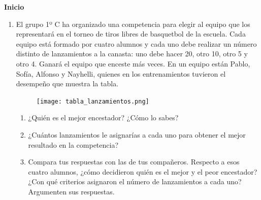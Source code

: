 \documentclass[11pt]{book}
\begin{document}
\begin{boxK}
  \begin{center}\textbf{Inicio}\end{center}
  \begin{enumerate}
    \item El grupo 1º C ha organizado una competencia para elegir al equipo que los
          representará en el torneo de tiros libres de basquetbol de la escuela. Cada
          equipo está formado por cuatro alumnos y cada uno debe realizar un número distinto
          de lanzamientos a la canasta: uno debe hacer 20, otro 10, otro 5 y
          otro 4. Ganará el equipo que enceste más veces.
          En un equipo están Pablo, Sofía, Alfonso y Nayhelli, quienes en los entrenamientos
          tuvieron el desempeño que muestra la tabla.
          \begin{figure}[H]
            \centering
            \texttt{[image: tabla\_lanzamientos.png]}
            \label{fig:tabla_lanzamientos}
          \end{figure}
          \begin{enumerate}
            \item ¿Quién es el mejor encestador? ¿Cómo lo sabes?
            \item ¿Cuántos lanzamientos le asignarías a cada uno para obtener el mejor resultado en la competencia?
            \item Compara tus respuestas con las de tus compañeros. Respecto a
                  esos cuatro alumnos, ¿cómo decidieron quién es el mejor y el
                  peor encestador? ¿Con qué criterios asignaron el número de
                  lanzamientos a cada uno? Argumenten sus respuestas.
          \end{enumerate}

  \end{enumerate}
\end{boxK}
\end{document}

